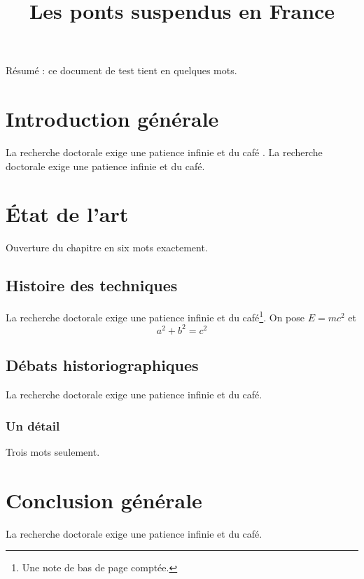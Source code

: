 \documentclass[12pt]{book}
\title{Les ponts suspendus en France}
\begin{document}
\maketitle
Résumé : ce document de test tient en quelques mots.
\chapter{Introduction générale}
La recherche doctorale exige une patience infinie et du café \cite{navier1823}. %
La recherche doctorale exige une patience infinie et du café.
\chapter{État de l'art}
Ouverture du chapitre en six mots exactement.
\section{Histoire des techniques}
La recherche doctorale exige une patience infinie et du café\footnote{Une note de bas de page comptée.}.
On pose $E = mc^2$ et
\begin{equation}
a^2 + b^2 = c^2
\end{equation}
\section{Débats historiographiques}
La recherche doctorale exige une patience infinie et du café.
\subsection{Un détail}
Trois mots seulement.
\chapter*{Conclusion générale}
La recherche doctorale exige une patience infinie et du café.


\end{document}
